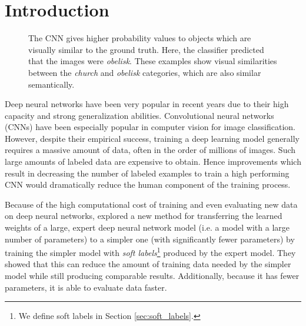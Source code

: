 \section{Introduction}


\begin{figure}[ht!]
  \centering



  \caption{
    The CNN gives higher probability values to objects which are visually similar to
    the ground truth. Here, the classifier predicted that the images were
    \emph{obelisk}. These examples show visual similarities between the
    \emph{church} and \emph{obelisk} categories, which are also similar
    semantically.
  }
  \label{fig:qualitative_results}
\end{figure}


Deep neural networks have been very popular in recent years due to their high
capacity and strong generalization abilities.  Convolutional neural networks
(CNNs) have been especially popular in computer vision for image classification.
However, despite their empirical success, training a deep learning model
generally requires a massive amount of data, often in the order of millions of
images. Such large amounts of labeled data are expensive to obtain. Hence 
improvements which result in decreasing the number of labeled examples to train
a high performing CNN would dramatically reduce the human component of the
training process.

Because of the high computational cost of training and even evaluating new data
on deep neural networks, \cite{hinton2015distilling} explored a new method
for transferring the learned weights of a large, expert deep neural network model
(i.e. a model with a large number of parameters) to a simpler one (with
significantly fewer parameters) by training the simpler model with \emph{soft
labels}\footnote{
  We define soft labels in Section \ref{sec:soft_labels}.
} produced by the expert model. They showed that this can reduce the
amount of training data needed by the simpler model while still producing
comparable results. Additionally, because it has fewer parameters, it is able to
evaluate data faster.

